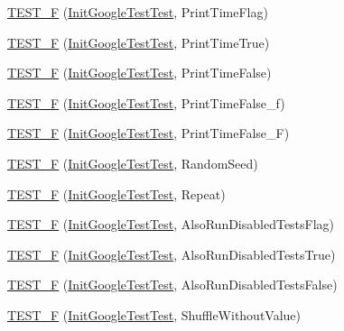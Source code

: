 \begin{DoxyCompactItemize}
\item 
\hyperlink{namespacetesting_aa832ff8ffe6b687c7025cbc766973e0b}{T\+E\+S\+T\+\_\+\+F} (\hyperlink{classtesting_1_1_init_google_test_test}{Init\+Google\+Test\+Test}, Print\+Time\+Flag)
\item 
\hyperlink{namespacetesting_ae0f76bbca8e2bf7d9de60c4b8b0dfa16}{T\+E\+S\+T\+\_\+\+F} (\hyperlink{classtesting_1_1_init_google_test_test}{Init\+Google\+Test\+Test}, Print\+Time\+True)
\item 
\hyperlink{namespacetesting_a1ec71efef2639ccb137ac5b7ccd8c9d1}{T\+E\+S\+T\+\_\+\+F} (\hyperlink{classtesting_1_1_init_google_test_test}{Init\+Google\+Test\+Test}, Print\+Time\+False)
\item 
\hyperlink{namespacetesting_af87ac7e6dc7c0ea1d85eaa3a57358d29}{T\+E\+S\+T\+\_\+\+F} (\hyperlink{classtesting_1_1_init_google_test_test}{Init\+Google\+Test\+Test}, Print\+Time\+False\+\_\+f)
\item 
\hyperlink{namespacetesting_a337ddb6629adb42219e612b67d18c6f1}{T\+E\+S\+T\+\_\+\+F} (\hyperlink{classtesting_1_1_init_google_test_test}{Init\+Google\+Test\+Test}, Print\+Time\+False\+\_\+\+F)
\item 
\hyperlink{namespacetesting_a2a1e31fea507bdd6e011450e2f316bcf}{T\+E\+S\+T\+\_\+\+F} (\hyperlink{classtesting_1_1_init_google_test_test}{Init\+Google\+Test\+Test}, Random\+Seed)
\item 
\hyperlink{namespacetesting_a254368f412c980556143a9182f451981}{T\+E\+S\+T\+\_\+\+F} (\hyperlink{classtesting_1_1_init_google_test_test}{Init\+Google\+Test\+Test}, Repeat)
\item 
\hyperlink{namespacetesting_ab6624d856abda0913f536a4e719dd769}{T\+E\+S\+T\+\_\+\+F} (\hyperlink{classtesting_1_1_init_google_test_test}{Init\+Google\+Test\+Test}, Also\+Run\+Disabled\+Tests\+Flag)
\item 
\hyperlink{namespacetesting_a3e73dbd19fb50e5ad516de9592963033}{T\+E\+S\+T\+\_\+\+F} (\hyperlink{classtesting_1_1_init_google_test_test}{Init\+Google\+Test\+Test}, Also\+Run\+Disabled\+Tests\+True)
\item 
\hyperlink{namespacetesting_a1c50ef2a972315130f1613c69204e259}{T\+E\+S\+T\+\_\+\+F} (\hyperlink{classtesting_1_1_init_google_test_test}{Init\+Google\+Test\+Test}, Also\+Run\+Disabled\+Tests\+False)
\item 
\hyperlink{namespacetesting_a2f1fd86207e6c7085455dc2d582d1d12}{T\+E\+S\+T\+\_\+\+F} (\hyperlink{classtesting_1_1_init_google_test_test}{Init\+Google\+Test\+Test}, Shuffle\+Without\+Value)
\item 

\end{DoxyCompactItemize}
